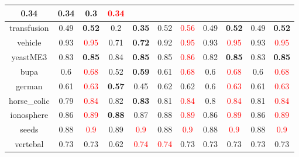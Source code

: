 \documentclass{article}%
\begin{document}
\begin{tabular}{c|cccccccccc}
{0.34
}&0.34&0.3&\textcolor{red}{ 
0.34
}\\%
\hline%
transfusion&0.49&\textbf{0.52}&0.2&\textbf{0.35}&0.52&\textcolor{red}{ 
0.56
}&0.49&\textbf{0.52}&0.49&\textbf{0.52}\\%
\hline%
vehicle&0.93&\textcolor{red}{ 
0.95
}&0.71&\textbf{0.72}&0.92&\textcolor{red}{ 
0.95
}&0.93&\textcolor{red}{ 
0.95
}&0.93&\textcolor{red}{ 
0.95
}\\%
\hline%
yeastME3&0.83&\textbf{0.85}&0.84&\textbf{0.85}&0.85&\textcolor{red}{ 
0.86
}&0.82&\textbf{0.85}&0.83&\textbf{0.85}\\%
\hline%
bupa&0.6&\textcolor{red}{ 
0.68
}&0.52&\textbf{0.59}&0.61&\textcolor{red}{ 
0.68
}&0.6&\textcolor{red}{ 
0.68
}&0.6&\textcolor{red}{ 
0.68
}\\%
\hline%
german&0.61&\textcolor{red}{ 
0.63
}&\textbf{0.57}&0.45&0.62&0.62&0.6&\textcolor{red}{ 
0.63
}&0.61&\textcolor{red}{ 
0.63
}\\%
\hline%
horse\_colic&0.79&\textcolor{red}{ 
0.84
}&0.82&\textbf{0.83}&0.81&\textcolor{red}{ 
0.84
}&0.8&\textcolor{red}{ 
0.84
}&0.81&\textcolor{red}{ 
0.84
}\\%
\hline%
ionosphere&0.86&\textcolor{red}{ 
0.89
}&\textbf{0.88}&0.87&0.88&\textcolor{red}{ 
0.89
}&0.86&\textcolor{red}{ 
0.89
}&0.86&\textcolor{red}{ 
0.89
}\\%
\hline%
seeds&0.88&\textcolor{red}{ 
0.9
}&0.89&\textcolor{red}{ 
0.9
}&0.88&\textcolor{red}{ 
0.9
}&0.88&\textcolor{red}{ 
0.9
}&0.88&\textcolor{red}{ 
0.9
}\\%
\hline%
vertebal&0.73&0.73&0.62&\textcolor{red}{ 
0.74
}&\textcolor{red}{ 
0.74
}&0.73&0.73&0.73&0.73&0.73\\%
\hline%
\end{tabular}

%
\end{document}
